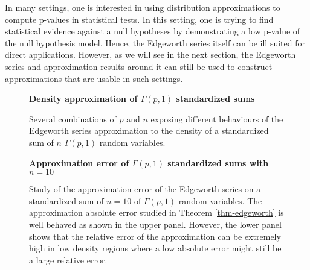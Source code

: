 \begin{example}
    In many settings, one is interested in using distribution approximations to compute p-values in statistical tests. In this setting, one is trying to find statistical evidence against a null hypotheses by demonstrating a low p-value of the null hypothesis model. Hence, the Edgeworth series itself can be ill suited for direct applications. However, as we will see in the next section, the Edgeworth series and approximation results around it can still be used to construct approximations that are usable in such settings.

    \begin{figure}[h]
        \textbf{Density approximation of $\Gamma(p,1)$ standardized sums}
        \centering
        \qquad
        \caption{Several combinations of $p$ and $n$ exposing different behaviours of the Edgeworth series approximation to the density of a standardized sum of $n$ $\Gamma(p, 1)$ random variables.}
        \label{fig-edgeworth}
    \end{figure}

    \begin{figure}[h]
        \textbf{Approximation error of $\Gamma(p,1)$ standardized sums with $n=10$}
        \centering
        \qquad
        \caption{Study of the approximation error of the Edgeworth series on a standardized sum of $n=10$ of $\Gamma(p, 1)$ random variables. The approximation absolute error studied in Theorem \ref{thm-edgeworth} is well behaved as shown in the upper panel. However, the lower panel shows that the relative error of the approximation can be extremely high in low density regions where a low absolute error might still be a large relative error.}
        \label{fig-edgeworth-err}
    \end{figure}


    
\end{example}